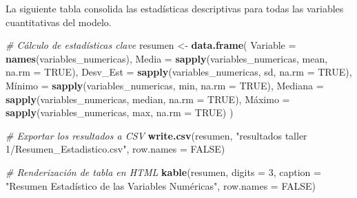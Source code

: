 \documentclass[
]{article}
\newenvironment{Shaded}{\begin{snugshade}}{\end{snugshade}}
\newcommand{\AttributeTok}[1]{\textcolor[rgb]{0.13,0.29,0.53}{#1}}
\newcommand{\CommentTok}[1]{\textcolor[rgb]{0.56,0.35,0.01}{\textit{#1}}}
\newcommand{\ConstantTok}[1]{\textcolor[rgb]{0.56,0.35,0.01}{#1}}
\newcommand{\DecValTok}[1]{\textcolor[rgb]{0.00,0.00,0.81}{#1}}
\newcommand{\FunctionTok}[1]{\textcolor[rgb]{0.13,0.29,0.53}{\textbf{#1}}}
\newcommand{\NormalTok}[1]{#1}
\newcommand{\OtherTok}[1]{\textcolor[rgb]{0.56,0.35,0.01}{#1}}
\newcommand{\StringTok}[1]{\textcolor[rgb]{0.31,0.60,0.02}{#1}}
\begin{document}
La siguiente tabla consolida las estadísticas descriptivas para todas
las variables cuantitativas del modelo.

\begin{Shaded}
\begin{Highlighting}[]
\CommentTok{\# Cálculo de estadísticas clave}
\NormalTok{resumen }\OtherTok{\textless{}{-}} \FunctionTok{data.frame}\NormalTok{(}
  \AttributeTok{Variable =} \FunctionTok{names}\NormalTok{(variables\_numericas),}
  \AttributeTok{Media =} \FunctionTok{sapply}\NormalTok{(variables\_numericas, mean, }\AttributeTok{na.rm =} \ConstantTok{TRUE}\NormalTok{),}
  \AttributeTok{Desv\_Est =} \FunctionTok{sapply}\NormalTok{(variables\_numericas, sd, }\AttributeTok{na.rm =} \ConstantTok{TRUE}\NormalTok{),}
\NormalTok{  Mínimo }\OtherTok{=} \FunctionTok{sapply}\NormalTok{(variables\_numericas, min, }\AttributeTok{na.rm =} \ConstantTok{TRUE}\NormalTok{),}
  \AttributeTok{Mediana =} \FunctionTok{sapply}\NormalTok{(variables\_numericas, median, }\AttributeTok{na.rm =} \ConstantTok{TRUE}\NormalTok{),}
\NormalTok{  Máximo }\OtherTok{=} \FunctionTok{sapply}\NormalTok{(variables\_numericas, max, }\AttributeTok{na.rm =} \ConstantTok{TRUE}\NormalTok{)}
\NormalTok{)}

\CommentTok{\# Exportar los resultados a CSV}
\FunctionTok{write.csv}\NormalTok{(resumen, }\StringTok{"resultados taller 1/Resumen\_Estadistico.csv"}\NormalTok{, }\AttributeTok{row.names =} \ConstantTok{FALSE}\NormalTok{)}

\CommentTok{\# Renderización de tabla en HTML}
\FunctionTok{kable}\NormalTok{(resumen, }\AttributeTok{digits =} \DecValTok{3}\NormalTok{, }\AttributeTok{caption =} \StringTok{"Resumen Estadístico de las Variables Numéricas"}\NormalTok{, }\AttributeTok{row.names =} \ConstantTok{FALSE}\NormalTok{)}
\end{Highlighting}
\end{Shaded}
\end{document}
